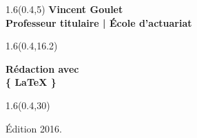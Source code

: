 \begingroup

\textblockorigin{0mm}{0mm}
\begin{frame}[plain]
  \begin{textblock*}{1.6\TPHorizModule}(0.4\TPHorizModule,5\TPVertModule)
    \titles\bfseries
    \fontsize{10}{11}\selectfont
    Vincent Goulet \\
    \mdseries
    \fontsize{9}{11}\selectfont
    Professeur titulaire | École d'actuariat
  \end{textblock*}

  \begin{textblock*}{1.6\TPHorizModule}(0.4\TPHorizModule,16.2\TPVertModule)
    \raggedright%
    \titles\bfseries
    \fontsize{20}{20}\selectfont
    Rédaction avec \\
    \rmfamily\mdseries
    \fontsize{22.5}{22.5}\selectfont
    \fontsize{40}{40}\selectfont%
    \{%
    \fontsize{35}{35}\selectfont%
    \LaTeX
    \fontsize{40}{40}\selectfont%
    \}
  \end{textblock*}

  \begin{textblock*}{1.6\TPHorizModule}(0.4\TPHorizModule,30\TPVertModule)
    \begin{minipage}{\textwidth}
      \titles\mdseries
      \fontsize{9}{11}\selectfont
      Édition 2016.{}
    \end{minipage}
  \end{textblock*}
\end{frame}
\endgroup

